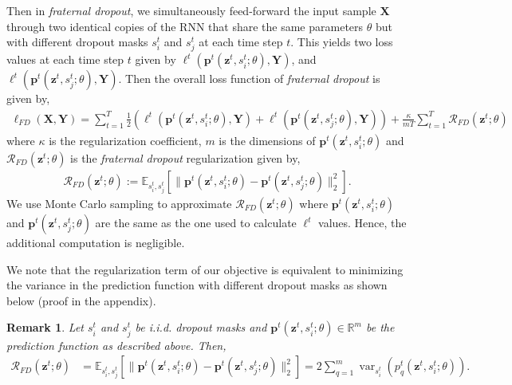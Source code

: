 \documentclass{article} \usepackage{iclr2018_conference,times}
\newtheorem{remark}{Remark}
\DeclareMathOperator{\var}{var}
\begin{document}
Then in \emph{fraternal dropout}, we simultaneously feed-forward the input sample $\mathbf{X}$ through two identical copies of the RNN that share the same parameters $\theta$ but with different dropout masks $s_i^t$ and $s_j^t$ at each time step $t$. This yields two loss values at each time step $t$ given by $\ell^t(\mathbf{p}^t(\mathbf{z}^t, s_i^t; \theta),\mathbf{Y})$, and $\ell^t(\mathbf{p}^t(\mathbf{z}^t, s_j^t; \theta),\mathbf{Y})$. Then the overall loss function of \emph{fraternal dropout} is given by,
\begin{align}
\ell_{FD}(\mathbf{X}, \mathbf{Y}) = \sum_{t=1}^T \frac{1}{2} \left( \ell^t(\mathbf{p}^t(\mathbf{z}^{t}, s_i^t; \theta),\mathbf{Y})  + \ell^t(\mathbf{p}^t(\mathbf{z}^{t}, s_j^t; \theta),\mathbf{Y})  \right) + \frac{\kappa}{mT}  \sum_{t=1}^T  \mathcal{R}_{FD}(\mathbf{z}^{t}; \theta)
\end{align}
where $\kappa$ is the regularization coefficient, $ m$ is the dimensions of $\mathbf{p}^t(\mathbf{z}^{t}, s_i^t; \theta)$ and $\mathcal{R}_{FD}(\mathbf{z}^{t}; \theta)$ is the \emph{fraternal dropout} regularization given by,
\begin{align}
\mathcal{R}_{FD}(\mathbf{z}^{t}; \theta) := \mathbb{E}_{s_i^t, s_j^t} \left[ \lVert \mathbf{p}^t(\mathbf{z}^{t}, s_i^t; \theta) - \mathbf{p}^t(\mathbf{z}^{t}, s_j^t; \theta) \rVert^2_2 \right].
\end{align}
We use Monte Carlo sampling to approximate $\mathcal{R}_{FD}(\mathbf{z}^{t}; \theta)$ where $\mathbf{p}^t(\mathbf{z}^{t}, s_i^t; \theta)$ and $\mathbf{p}^t(\mathbf{z}^{t}, s_j^t; \theta)$ are the same as the one used to calculate $\ell^t$ values. Hence, the additional computation is negligible.

We note that the regularization term of our objective is equivalent to minimizing the variance in the prediction function with different dropout masks as shown below (proof in the appendix).
\begin{remark}
\label{remark_var}
Let $s_i^t$ and $s_j^t$ be i.i.d. dropout masks and $\mathbf{p}^t(\mathbf{z}^t, s_i^t; \theta) \in \mathbb{R}^m$ be the prediction function as described above. Then, 
\begin{align}
\mathcal{R}_{FD}(\mathbf{z}^{t}; \theta) &= \mathbb{E}_{s_i^t, s_j^t} \left[ \lVert \mathbf{p}^t(\mathbf{z}^t, s_i^t; \theta) - \mathbf{p}^t(\mathbf{z}^t, s_j^t; \theta) \rVert^2_2 \right] = 2\sum_{q=1}^{m} \var_{s_i^t}( {p}_q^t(\mathbf{z}^t, s_i^t; \theta) ).
\end{align}
\end{remark}
\end{document}
